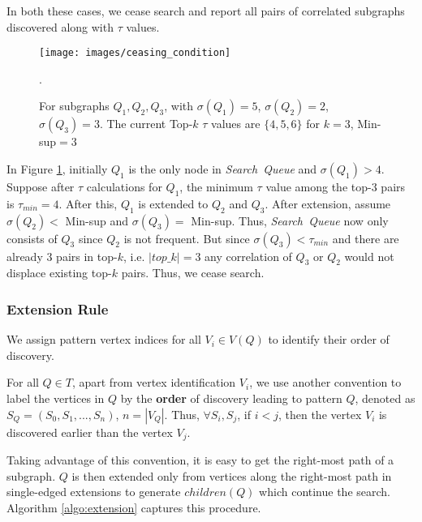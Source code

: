 In both these cases, we cease search and report all pairs of correlated
subgraphs discovered along with $\tau$ values.

\begin{figure}[t!]
	\centering
	\texttt{[image: images/ceasing\_condition]}
	\vspace{-2mm}
	\caption{\scriptsize For subgraphs $Q_1,Q_2,Q_3$, with $\sigma(Q_1)=5$,
	$\sigma(Q_2)=2$, $\sigma(Q_3)=3$. The current {\sf Top-$k$} $\tau$ values
	are $\{4,5,6\}$ for $k=3$, {\sf Min-sup}$=3$}.
	\label{fig:ceasing_condition}
	\vspace{-6mm}
\end{figure}
\begin{exple}
	In Figure \ref{fig:ceasing_condition}, initially $Q_1$ is the
	only node in \emph{Search\ Queue} and $\sigma(Q_1)>4$. Suppose after
	$\tau$ calculations for $Q_1$, the minimum
	$\tau$ value among the {\sf top-$3$} pairs is $\tau{_{min}}=4$. After this,
	$Q_1$ is extended to $Q_2$ and $Q_3$. After extension, assume $\sigma(Q_2)<${\sf
	Min-sup} and $\sigma(Q_3)=$ {\sf Min-sup}. Thus, \emph{Search\ Queue} now only
	consists of $Q_3$ since $Q_2$ is not frequent.
	But since $\sigma(Q_3)<\tau{_{min}}$ and there are already $3$ pairs in {\sf top-$k$}, i.e.
	$|top\_k|=3$ any correlation of $Q_3$ or $Q_2$ would not displace existing
	{\sf top-$k$} pairs. Thus, we cease search.
\end{exple}

\subsubsection{Extension Rule}
We assign pattern vertex indices for all $V_i\in V(Q)$ to identify their order of discovery.
\begin{defn} For all $Q\in T$, apart from vertex
	identification $V_i$, we use another convention to label the vertices in $Q$
	by the \textbf{order} of discovery leading to pattern $Q$, denoted as
	$S_Q=(S_0,S_1,...,S_n)$, $n=|V_Q|$. Thus, $\forall S_i, S_j$, if $i<j$, then
	the vertex $V_i$ is discovered earlier than the vertex $V_j$.
\end{defn}

Taking advantage of this convention, it is easy to get the right-most path of a
subgraph. $Q$ is then extended only from vertices along the right-most path in
single-edged extensions to generate $children(Q)$ which continue the search. Algorithm
\ref{algo:extension} captures this procedure.

